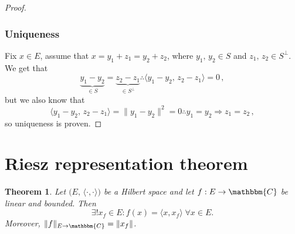 \documentclass[12pt, a4paper]{article}
\newcommand{\C}{\ensuremath{\mathbbm{C}}}
\newtheorem{theorem}{Theorem}[section]
\begin{document}
\begin{proof}
\subsubsection*{Uniqueness}
Fix $x\in E$, assume that $x=y_1+z_1=y_2+z_2$, where $y_1,\,y_2\in S$ and $z_1,\,z_2\in S^\perp$. We get that
\[
    \underbrace{y_1-y_2}_{\in S}=\underbrace{z_2-z_1}_{\in S^\perp}\therefore \langle y_1-y_2,\,z_2-z_1\rangle=0\,,
\]
but we also know that
\[
    \langle y_1-y_2,\,z_2-z_1\rangle=\|y_1-y_2\|^2=0\therefore y_1=y_2\Rightarrow z_1=z_2\,,
\]
so uniqueness is proven.
\end{proof}
\section{Riesz representation theorem}
\begin{theorem}
Let $\big(E,\,\langle \cdot, \cdot\rangle\big)$ be a Hilbert space and let $f : E \to \C$ be linear and bounded. Then
\begin{equation*}
\exists! x_f\in E : f(x) = \langle x, x_f \rangle \; \forall x\in E.
\end{equation*}
Moreover, $\|f\|_{E\to \C} = \|x_f\|$.
\end{theorem}
\end{document}
